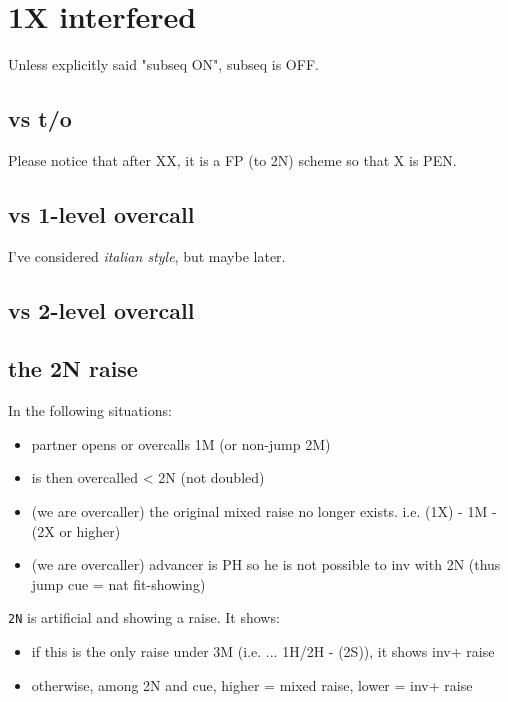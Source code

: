 \section{1X interfered}

Unless explicitly said "subseq ON", subseq is OFF.

\subsection{vs t/o}

Please notice that after XX, it is a FP (to 2N) scheme so that X is PEN.


\subsection{vs 1-level overcall}

I've considered \textit{italian style}, but maybe later.


\subsection{vs 2-level overcall}


\subsection{the 2N raise}

In the following situations:

\begin{itemize}
    \setlength\itemsep{0pt}
    \item partner opens or overcalls 1M (or non-jump 2M)
    \item is then overcalled < 2N (not doubled)
    \item (we are overcaller) the original mixed raise no longer exists. i.e. (1X) - 1M - (2X or higher)
    \item (we are overcaller) advancer is PH so he is not possible to inv with 2N (thus jump cue = nat fit-showing)
\end{itemize}

\texttt{2N} is artificial and showing a raise. It shows:

\begin{itemize}
    \setlength\itemsep{0pt}
    \item if this is the only raise under 3M (i.e. ... 1H/2H - (2S)), it shows inv+ raise
    \item otherwise, among 2N and cue, higher = mixed raise, lower = inv+ raise
\end{itemize}

